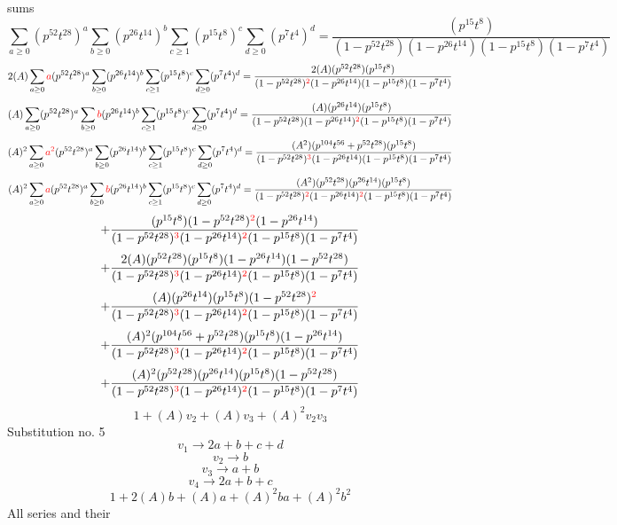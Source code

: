\documentclass{article}
\begin{document}
sums\[\sum_{a\geq{0}}(p^{52}t^{28})^{a}\sum_{b\geq{0}}(p^{26}t^{14})^{b}\sum_{c\geq{1}}(p^{15}t^{8})^{c}\sum_{d\geq{0}}(p^{7}t^{4})^{d}=\frac{(p^{15}t^{8})}{(1-p^{52}t^{28})(1-p^{26}t^{14})(1-p^{15}t^{8})(1-p^{7}t^{4})}\]\[2(A)\sum_{a\geq{0}}\textcolor{red}{a}(p^{52}t^{28})^{a}\sum_{b\geq{0}}(p^{26}t^{14})^{b}\sum_{c\geq{1}}(p^{15}t^{8})^{c}\sum_{d\geq{0}}(p^{7}t^{4})^{d}=\frac{2(A)(p^{52}t^{28})(p^{15}t^{8})}{(1-p^{52}t^{28})^{\textcolor{red}{2}}(1-p^{26}t^{14})(1-p^{15}t^{8})(1-p^{7}t^{4})}\]\[(A)\sum_{a\geq{0}}(p^{52}t^{28})^{a}\sum_{b\geq{0}}\textcolor{red}{b}(p^{26}t^{14})^{b}\sum_{c\geq{1}}(p^{15}t^{8})^{c}\sum_{d\geq{0}}(p^{7}t^{4})^{d}=\frac{(A)(p^{26}t^{14})(p^{15}t^{8})}{(1-p^{52}t^{28})(1-p^{26}t^{14})^{\textcolor{red}{2}}(1-p^{15}t^{8})(1-p^{7}t^{4})}\]\[(A)^{2}\sum_{a\geq{0}}\textcolor{red}{a^{2}}(p^{52}t^{28})^{a}\sum_{b\geq{0}}(p^{26}t^{14})^{b}\sum_{c\geq{1}}(p^{15}t^{8})^{c}\sum_{d\geq{0}}(p^{7}t^{4})^{d}=\frac{(A^{2})(p^{104}t^{56}+p^{52}t^{28})(p^{15}t^{8})}{(1-p^{52}t^{28})^{\textcolor{red}{3}}(1-p^{26}t^{14})(1-p^{15}t^{8})(1-p^{7}t^{4})}\]\[(A)^{2}\sum_{a\geq{0}}\textcolor{red}{a}(p^{52}t^{28})^{a}\sum_{b\geq{0}}\textcolor{red}{b}(p^{26}t^{14})^{b}\sum_{c\geq{1}}(p^{15}t^{8})^{c}\sum_{d\geq{0}}(p^{7}t^{4})^{d}=\frac{(A^{2})(p^{52}t^{28})(p^{26}t^{14})(p^{15}t^{8})}{(1-p^{52}t^{28})^{\textcolor{red}{2}}(1-p^{26}t^{14})^{\textcolor{red}{2}}(1-p^{15}t^{8})(1-p^{7}t^{4})}\]\[+\frac{(p^{15}t^{8})(1-p^{52}t^{28})^{\textcolor{red}{2}}(1-p^{26}t^{14})}{(1-p^{52}t^{28})^{\textcolor{red}{3}}(1-p^{26}t^{14})^{\textcolor{red}{2}}(1-p^{15}t^{8})(1-p^{7}t^{4})}\]\[+\frac{2(A)(p^{52}t^{28})(p^{15}t^{8})(1-p^{26}t^{14})(1-p^{52}t^{28})}{(1-p^{52}t^{28})^{\textcolor{red}{3}}(1-p^{26}t^{14})^{\textcolor{red}{2}}(1-p^{15}t^{8})(1-p^{7}t^{4})}\]\[+\frac{(A)(p^{26}t^{14})(p^{15}t^{8})(1-p^{52}t^{28})^{\textcolor{red}{2}}}{(1-p^{52}t^{28})^{\textcolor{red}{3}}(1-p^{26}t^{14})^{\textcolor{red}{2}}(1-p^{15}t^{8})(1-p^{7}t^{4})}\]\[+\frac{(A)^{2}(p^{104}t^{56}+p^{52}t^{28})(p^{15}t^{8})(1-p^{26}t^{14})}{(1-p^{52}t^{28})^{\textcolor{red}{3}}(1-p^{26}t^{14})^{\textcolor{red}{2}}(1-p^{15}t^{8})(1-p^{7}t^{4})}\]\[+\frac{(A)^{2}(p^{52}t^{28})(p^{26}t^{14})(p^{15}t^{8})(1-p^{52}t^{28})}{(1-p^{52}t^{28})^{\textcolor{red}{3}}(1-p^{26}t^{14})^{\textcolor{red}{2}}(1-p^{15}t^{8})(1-p^{7}t^{4})}\]\[1+(A)v_2+(A)v_3+(A)^2v_2v_3\]Substitution no. 5\[v_1\rightarrow{2a+b+c+d}\]\[v_2\rightarrow{b}\]\[v_3\rightarrow{a+b}\]\[v_4\rightarrow{2a+b+c}\]\[1+2(A)b+(A)a+(A)^2ba+(A)^2b^{2}\]All series and their 
\end{document}
